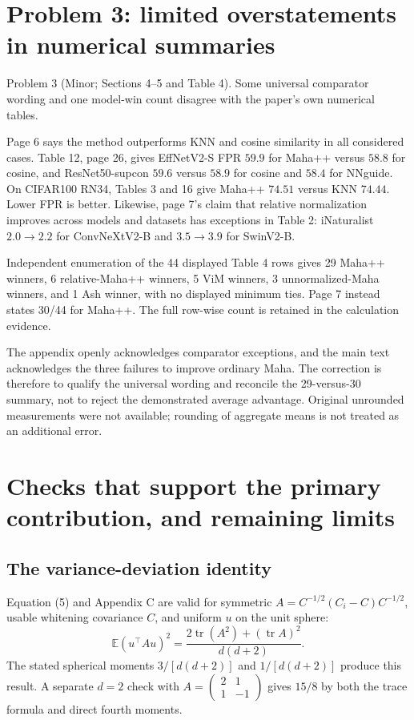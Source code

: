 \documentclass[10pt]{article}
\begin{document}
\section*{Problem 3: limited overstatements in numerical summaries}
Problem 3 (Minor; Sections 4–5 and Table 4).  Some universal comparator wording and one model-win count disagree with the paper’s own numerical tables.\par
Page 6 says the method outperforms KNN and cosine similarity in all considered cases. Table 12, page 26, gives EffNetV2-S FPR \(59.9\) for Maha++ versus \(58.8\) for cosine, and ResNet50-supcon \(59.6\) versus \(58.9\) for cosine and \(58.4\) for NNguide. On CIFAR100 RN34, Tables 3 and 16 give Maha++ \(74.51\) versus KNN \(74.44\). Lower FPR is better. Likewise, page 7’s claim that relative normalization improves across models and datasets has exceptions in Table 2: iNaturalist \(2.0\to2.2\) for ConvNeXtV2-B and \(3.5\to3.9\) for SwinV2-B.\par
Independent enumeration of the 44 displayed Table 4 rows gives 29 Maha++ winners, 6 relative-Maha++ winners, 5 ViM winners, 3 unnormalized-Maha winners, and 1 Ash winner, with no displayed minimum ties. Page 7 instead states 30/44 for Maha++. The full row-wise count is retained in the calculation evidence.\par
The appendix openly acknowledges comparator exceptions, and the main text acknowledges the three failures to improve ordinary Maha. The correction is therefore to qualify the universal wording and reconcile the 29-versus-30 summary, not to reject the demonstrated average advantage. Original unrounded measurements were not available; rounding of aggregate means is not treated as an additional error.\par
\section*{Checks that support the primary contribution, and remaining limits}
\subsection*{The variance-deviation identity}
Equation (5) and Appendix C are valid for symmetric \(A=C^{-1/2}(C_i-C)C^{-1/2}\), usable whitening covariance \(C\), and uniform \(u\) on the unit sphere: \[\mathbb E(u^\top A u)^2
 =\frac{2\operatorname{tr}(A^2)+(\operatorname{tr}A)^2}{d(d+2)}.\] The stated spherical moments \(3/[d(d+2)]\) and \(1/[d(d+2)]\) produce this result. A separate \(d=2\) check with \(A=\left(\begin{smallmatrix}2&1\\1&-1\end{smallmatrix}\right)\) gives \(15/8\) by both the trace formula and direct fourth moments.\par
\end{document}
